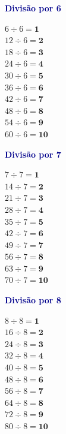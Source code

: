 \documentclass[12pt]{article}
\begin{document}
\vspace{10pt}\noindent
\begin{minipage}[t]{3.3cm}
\noindent\textcolor{darkblue}{\bfseries\small Divisão por 6}\par\vspace{2pt}
{\footnotesize
$6\div6=\mathbf{1}$\\$12\div6=\mathbf{2}$\\$18\div6=\mathbf{3}$\\
$24\div6=\mathbf{4}$\\$30\div6=\mathbf{5}$\\$36\div6=\mathbf{6}$\\
$42\div6=\mathbf{7}$\\$48\div6=\mathbf{8}$\\$54\div6=\mathbf{9}$\\
$60\div6=\mathbf{10}$}
\end{minipage}\hfill
\begin{minipage}[t]{3.3cm}
\noindent\textcolor{darkblue}{\bfseries\small Divisão por 7}\par\vspace{2pt}
{\footnotesize
$7\div7=\mathbf{1}$\\$14\div7=\mathbf{2}$\\$21\div7=\mathbf{3}$\\
$28\div7=\mathbf{4}$\\$35\div7=\mathbf{5}$\\$42\div7=\mathbf{6}$\\
$49\div7=\mathbf{7}$\\$56\div7=\mathbf{8}$\\$63\div7=\mathbf{9}$\\
$70\div7=\mathbf{10}$}
\end{minipage}\hfill
\begin{minipage}[t]{3.3cm}
\noindent\textcolor{darkblue}{\bfseries\small Divisão por 8}\par\vspace{2pt}
{\footnotesize
$8\div8=\mathbf{1}$\\$16\div8=\mathbf{2}$\\$24\div8=\mathbf{3}$\\
$32\div8=\mathbf{4}$\\$40\div8=\mathbf{5}$\\$48\div8=\mathbf{6}$\\
$56\div8=\mathbf{7}$\\$64\div8=\mathbf{8}$\\$72\div8=\mathbf{9}$\\
$80\div8=\mathbf{10}$}
\end{minipage}\hfill
\end{document}

